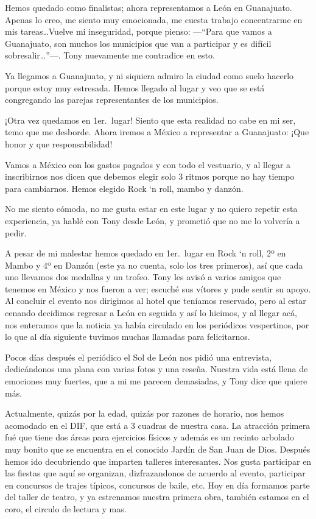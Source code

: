 \documentclass[letterpaper, 12pt]{book}
\begin{document}
Hemos quedado como finalistas; ahora representamos a León en Guanajuato.  Apenas lo creo, me siento muy emocionada, me cuesta trabajo concentrarme en mis tareas\ldots Vuelve mi inseguridad, porque pienso: ---``Para que vamos a Guanajuato, son muchos los municipios que van a participar y es difícil sobresalir\ldots''---. Tony nuevamente me contradice en esto. 

Ya llegamos a Guanajuato, y ni siquiera admiro la ciudad como suelo hacerlo porque estoy muy estresada. Hemos llegado al lugar y veo que se está congregando las parejas representantes de los municipios.

¡Otra vez quedamos en 1er.\ lugar! Siento que esta realidad no cabe en mi ser, temo que me desborde. Ahora iremos a México a representar a Guanajuato: ¡Que honor y que responsabilidad!

Vamos a México con los gastos pagados y con todo el vestuario, y al llegar a inscribirnos nos dicen que debemos elegir solo 3 ritmos porque no hay tiempo para cambiarnos. Hemos elegido Rock `n roll, mambo y danzón.

No me siento cómoda, no me gusta estar en este lugar y no quiero repetir esta experiencia, ya hablé con Tony desde León, y prometió que no me lo volvería a pedir. 

A pesar de mi malestar hemos quedado en 1er.\ lugar en Rock `n roll, 2º en Mambo y 4º en Danzón (este ya no cuenta, solo los tres primeros), así que cada uno llevamos dos medallas y un trofeo. Tony les avisó a varios amigos que tenemos en México y nos fueron a ver; escuché sus vítores y pude sentir su apoyo. Al concluir el evento nos dirigimos al hotel que teníamos reservado, pero al estar cenando decidimos regresar a León en seguida y así lo hicimos, y al llegar acá, nos enteramos que la noticia ya había circulado en los periódicos vespertinos, por lo que al día siguiente tuvimos muchas llamadas para felicitarnos.

Pocos días después el periódico el Sol de León nos pidió una entrevista, dedicándonos una plana con varias fotos y una reseña.
Nuestra vida está llena de emociones muy fuertes, que a mi me parecen demasiadas, y Tony dice que quiere más.

Actualmente, quizás por la edad, quizás por razones de horario, nos hemos acomodado en el DIF, que está a 3 cuadras de nuestra casa. La atracción primera fué que tiene dos áreas para ejercicios físicos y además es un recinto arbolado muy bonito que se encuentra en el conocido Jardín de San Juan de Dios. Después hemos ido decubriendo que imparten talleres interesantes. Nos gusta participar en las fiestas que aquí se organizan, dizfrazandonos de acuerdo al evento, participar en concursos de trajes típicos, concursos de baile, etc.
Hoy en día formamos parte del taller de teatro, y ya estrenamos nuestra primera obra, también estamos en el coro, el circulo de lectura y mas.
\end{document}
